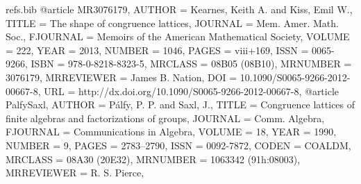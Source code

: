 \begin{filecontents*}{refs.bib}
@article {MR3076179,
    AUTHOR = {Kearnes, Keith A. and Kiss, Emil W.},
     TITLE = {The shape of congruence lattices},
   JOURNAL = {Mem. Amer. Math. Soc.},
  FJOURNAL = {Memoirs of the American Mathematical Society},
    VOLUME = {222},
      YEAR = {2013},
    NUMBER = {1046},
     PAGES = {viii+169},
      ISSN = {0065-9266},
      ISBN = {978-0-8218-8323-5},
   MRCLASS = {08B05 (08B10)},
  MRNUMBER = {3076179},
MRREVIEWER = {James B. Nation},
       DOI = {10.1090/S0065-9266-2012-00667-8},
       URL = {http://dx.doi.org/10.1090/S0065-9266-2012-00667-8},
}
@article {PalfySaxl,
    AUTHOR = {P{\'a}lfy, P. P. and Saxl, J.},
     TITLE = {Congruence lattices of finite algebras and factorizations of
              groups},
   JOURNAL = {Comm. Algebra},
  FJOURNAL = {Communications in Algebra},
    VOLUME = {18},
      YEAR = {1990},
    NUMBER = {9},
     PAGES = {2783--2790},
      ISSN = {0092-7872},
     CODEN = {COALDM},
   MRCLASS = {08A30 (20E32)},
  MRNUMBER = {1063342 (91h:08003)},
MRREVIEWER = {R. S. Pierce},
}
\end{filecontents*}

\documentclass{amsart}
\usepackage{amscd,amssymb}  %
\usepackage{amsfonts}%
\usepackage{mathrsfs}
\usepackage{stmaryrd,enumerate}
\usepackage{latexsym,mathrsfs,ifthen}
\usepackage{mathtools}
\usepackage[mathcal]{euscript}
\usepackage[style = ieee, urldate = comp]{biblatex}
\usepackage[colorlinks=true,urlcolor=black,linkcolor=black,citecolor=black]{hyperref}
\usepackage{scalefnt}
\usepackage{tikz}
\usepackage{color}
\usepackage{graphicx}
\usepackage{comment}
\usepackage{bm}
\usepackage{proof-dashed}
\newrobustcmd*{\entails}{\vdash}

%
%

